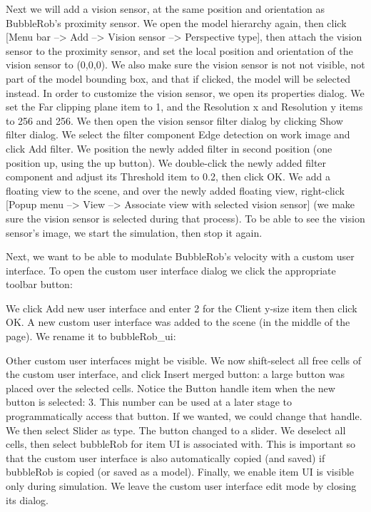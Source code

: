 Next we will add a vision sensor, at the same position and orientation as 
BubbleRob's proximity sensor. We open the model hierarchy again, then 
click [Menu bar --> Add --> Vision sensor --> Perspective type], then
attach the vision sensor to the proximity sensor, and set the local 
position and orientation of the vision sensor to (0,0,0). We also make 
sure the vision sensor is not not visible, not part of the model bounding
box, and that if clicked, the model will be selected instead. In order to
customize the vision sensor, we open its properties dialog. We set the Far
clipping plane item to 1, and the Resolution x and Resolution y items to 
256 and 256. We then open the vision sensor filter dialog by clicking Show
filter dialog. We select the filter component Edge detection on work image
and click Add filter. We position the newly added filter in second position
(one position up, using the up button). We double-click the newly added
filter component and adjust its Threshold item to 0.2, then click OK. We 
add a floating view to the scene, and over the newly added floating view,
right-click [Popup menu --> View --> Associate view with selected vision 
sensor] (we make sure the vision sensor is selected during that process). 
To be able to see the vision sensor's image, we start the simulation, 
then stop it again.

Next, we want to be able to modulate BubbleRob's velocity with a custom 
user interface. To open the custom user interface dialog we click the
appropriate toolbar button:


We click Add new user interface and enter 2 for the Client y-size item 
then click OK. A new custom user interface was added to the scene (in the
middle of the page). We rename it to bubbleRob\_ui:


Other custom user interfaces might be visible. We now shift-select all 
free cells of the custom user interface, and click Insert merged button:
a large button was placed over the selected cells. Notice the Button handle
item when the new button is selected: 3. This number can be used at a later
stage to programmatically access that button. If we wanted, we could change
that handle. We then select Slider as type. The button changed to a slider.
We deselect all cells, then select bubbleRob for item UI is associated with.
This is important so that the custom user interface is also automatically
copied (and saved) if bubbleRob is copied (or saved as a model). Finally, 
we enable item UI is visible only during simulation. We leave the custom 
user interface edit mode by closing its dialog. 

